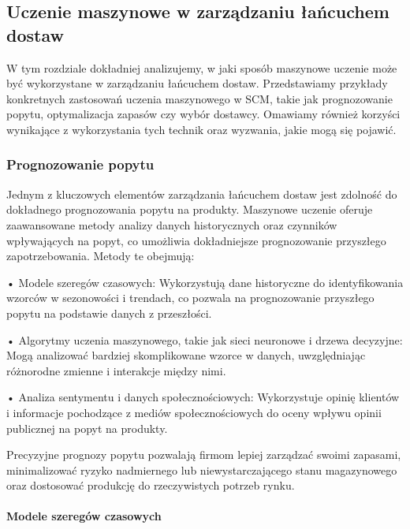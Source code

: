 \subsection{Uczenie maszynowe w zarządzaniu łańcuchem dostaw}
W tym rozdziale dokładniej analizujemy, w jaki sposób maszynowe uczenie może być wykorzystane w zarządzaniu łańcuchem dostaw. Przedstawiamy przykłady konkretnych zastosowań uczenia maszynowego w SCM, takie jak prognozowanie popytu, optymalizacja zapasów czy wybór dostawcy. Omawiamy również korzyści wynikające z wykorzystania tych technik oraz wyzwania, jakie mogą się pojawić.
\subsubsection{Prognozowanie popytu}
Jednym z kluczowych elementów zarządzania łańcuchem dostaw jest zdolność do dokładnego prognozowania popytu na produkty. Maszynowe uczenie oferuje zaawansowane metody analizy danych historycznych oraz czynników wpływających na popyt, co umożliwia dokładniejsze prognozowanie przyszłego zapotrzebowania. Metody te obejmują:

    • Modele szeregów czasowych: Wykorzystują dane historyczne do identyfikowania wzorców w sezonowości i trendach, co pozwala na prognozowanie przyszłego popytu na podstawie danych z przeszłości.
    
    • Algorytmy uczenia maszynowego, takie jak sieci neuronowe i drzewa decyzyjne: Mogą analizować bardziej skomplikowane wzorce w danych, uwzględniając różnorodne zmienne i interakcje między nimi.
    
    • Analiza sentymentu i danych społecznościowych: Wykorzystuje opinię klientów i informacje pochodzące z mediów społecznościowych do oceny wpływu opinii publicznej na popyt na produkty.
    
Precyzyjne prognozy popytu pozwalają firmom lepiej zarządzać swoimi zapasami, minimalizować ryzyko nadmiernego lub niewystarczającego stanu magazynowego oraz dostosować produkcję do rzeczywistych potrzeb rynku.

\paragraph{Modele szeregów czasowych}


